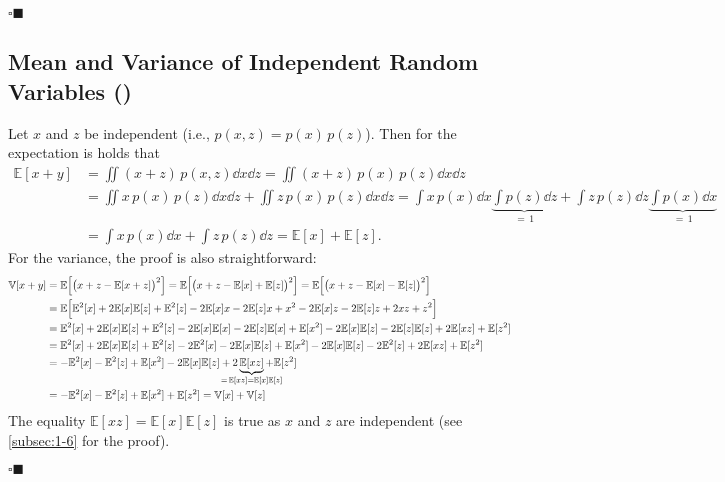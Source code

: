 \documentclass[11pt, a4paper]{scrartcl}
\newcommand{\E}{\mathbb{E}}
\newcommand{\Var}{\mathbb{V}}
\newcommand{\qedeot}{\hfill\(\square\blacksquare\)}
\newcommand{\diffstar}{\texorpdfstring{\raisebox{-1pt}{\resizebox{!}{8pt}{\(\star\)}}}{*}}
\newcommand{\onestar}  {(\diffstar)}
\begin{document}
			\qedeot

		\subsection{Mean and Variance of Independent Random Variables  \onestar}
			\label{subsec:1-10}

			Let \(x\) and \(z\) be independent (i.e., \( p(x, z) = p(x) \, p(z) \)). Then for the expectation is holds that
			\begin{align}
				\E[x + y]
					&= \iint\! (x + z) \, p(x, z) \dd{x} \dd{z}
					 = \iint\! (x + z) \, p(x) \, p(z) \dd{x} \dd{z} \\
					&= \iint\! x \, p(x) \, p(z) \dd{x} \dd{z} + \iint\! z \, p(x) \, p(z) \dd{x} \dd{z}
					 = \int\! x \, p(x) \dd{x} \underbrace{\int\! p(z) \dd{z}}_{=\, 1} + \int\! z \, p(z) \dd{z} \underbrace{\int\! p(x) \dd{x}}_{=\, 1} \\
					&= \int\! x \, p(x) \dd{x} + \int\! z \, p(z) \dd{z}
					 = \E[x] + \E[z].
			\end{align}
			For the variance, the proof is also straightforward:
			\begin{align}
				\Var[x + y]
					&= \E\Big[ \big( x + z - \E[x + z] \big)^2 \Big]
					 = \E\Big[ \big( x + z - \E[x] + \E[z] \big)^2 \Big]
					 = \E\Big[ \big( x + z - \E[x] - \E[z] \big)^2 \Big] \\
					&= \E\Big[ \E^2[x] + 2 \E[x] \E[z] + \E^2[z] - 2 \E[x] x - 2 \E[z] x + x^2 - 2 \E[x] z - 2 \E[z] z + 2 x z + z^2 \Big] \\
					&= \E^2[x] + 2 \E[x] \E[z] + \E^2[z] - 2 \E[x] \E[x] - 2 \E[z] \E[x] + \E[x^2] - 2 \E[x] \E[z] - 2 \E[z] \E[z] + 2 \E[xz] + \E[z^2] \\
					&= \E^2[x] + 2 \E[x] \E[z] + \E^2[z] - 2 \E^2[x] - 2 \E[x] \E[z] + \E[x^2] - 2 \E[x] \E[z] - 2 \E^2[z] + 2 \E[xz] + \E[z^2] \\
					&= -\E^2[x] - \E^2[z] + \E[x^2] - 2 \E[x] \E[z] + 2 \underbrace{\E[xz]}_{\mathclap{=\, \E[xz] = \E[x] \E[z]}} + \E[z^2] \\
					&= -\E^2[x] - \E^2[z] + \E[x^2] + \E[z^2]
					 = \Var[x] + \Var[z]
			\end{align}
			The equality \( \E[xz] = \E[x] \E[z] \) is true as \(x\) and \(z\) are independent (see \autoref{subsec:1-6} for the proof).

			\qedeot
\end{document}
